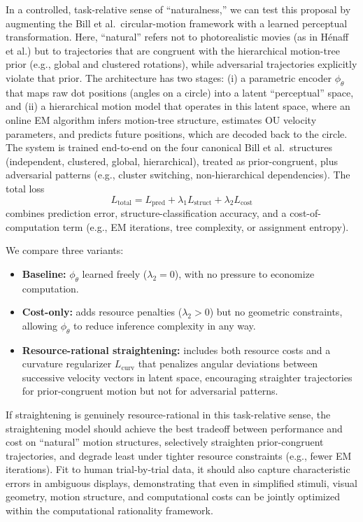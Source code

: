 \documentclass{article}
\begin{document}
In a controlled, task-relative sense of ``naturalness,'' we can test this proposal by augmenting the Bill et al.\ circular-motion framework with a learned perceptual transformation. Here, ``natural'' refers not to photorealistic movies (as in Hénaff et al.) but to trajectories that are congruent with the hierarchical motion-tree prior (e.g., global and clustered rotations), while adversarial trajectories explicitly violate that prior. The architecture has two stages: (i) a parametric encoder $\phi_\theta$ that maps raw dot positions (angles on a circle) into a latent ``perceptual'' space, and (ii) a hierarchical motion model that operates in this latent space, where an online EM algorithm infers motion-tree structure, estimates OU velocity parameters, and predicts future positions, which are decoded back to the circle. The system is trained end-to-end on the four canonical Bill et al.\ structures (independent, clustered, global, hierarchical), treated as prior-congruent, plus adversarial patterns (e.g., cluster switching, non-hierarchical dependencies). The total loss
%
\begin{equation}
L_{\text{total}} = L_{\text{pred}} + \lambda_1 L_{\text{struct}} + \lambda_2 L_{\text{cost}}
\end{equation}
%
combines prediction error, structure-classification accuracy, and a cost-of-computation term (e.g., EM iterations, tree complexity, or assignment entropy).

We compare three variants:

\begin{itemize}
    \item \textbf{Baseline:} $\phi_\theta$ learned freely ($\lambda_2 = 0$), with no pressure to economize computation.
    
    \item \textbf{Cost-only:} adds resource penalties ($\lambda_2 > 0$) but no geometric constraints, allowing $\phi_\theta$ to reduce inference complexity in any way.
    
    \item \textbf{Resource-rational straightening:} includes both resource costs and a curvature regularizer $L_{\text{curv}}$ that penalizes angular deviations between successive velocity vectors in latent space, encouraging straighter trajectories for prior-congruent motion but not for adversarial patterns.
\end{itemize}

If straightening is genuinely resource-rational in this task-relative sense, the straightening model should achieve the best tradeoff between performance and cost on ``natural'' motion structures, selectively straighten prior-congruent trajectories, and degrade least under tighter resource constraints (e.g., fewer EM iterations). Fit to human trial-by-trial data, it should also capture characteristic errors in ambiguous displays, demonstrating that even in simplified stimuli, visual geometry, motion structure, and computational costs can be jointly optimized within the computational rationality framework.
\end{document}
